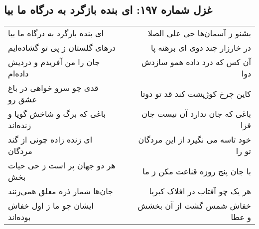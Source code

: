 \begin{center}
\section*{غزل شماره ۱۹۷: ای بنده بازگرد به درگاه ما بیا}
\label{sec:0197}
\begin{longtable}{l p{0.5cm} r}
ای بنده بازگرد به درگاه ما بیا
&&
بشنو ز آسمان‌ها حی علی الصلا
\\
درهای گلستان ز پی تو گشاده‌ایم
&&
در خارزار چند دوی ای برهنه پا
\\
جان را من آفریدم و دردیش داده‌ام
&&
آن کس که درد داده همو سازدش دوا
\\
قدی چو سرو خواهی در باغ عشق رو
&&
کاین چرخ کوژپشت کند قد تو دوتا
\\
باغی که برگ و شاخش گویا و زنده‌اند
&&
باغی که جان ندارد آن نیست جان فزا
\\
ای زنده زاده چونی از گند مردگان
&&
خود تاسه می نگیرد از این مردگان تو را
\\
هر دو جهان پر است ز حی حیات بخش
&&
با جان پنج روزه قناعت مکن ز ما
\\
جان‌ها شمار ذره معلق همی‌زنند
&&
هر یک چو آفتاب در افلاک کبریا
\\
ایشان چو ما ز اول خفاش بوده‌اند
&&
خفاش شمس گشت از آن بخشش و عطا
\\
\end{longtable}
\end{center}
